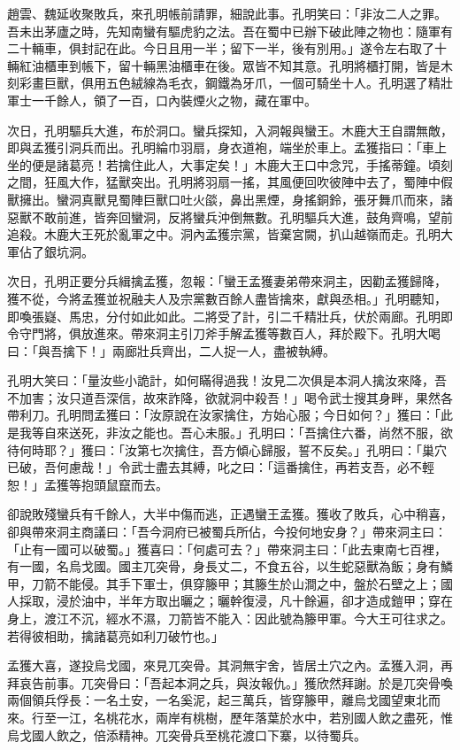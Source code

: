 趙雲、魏延收聚敗兵，來孔明帳前請罪，細說此事。孔明笑曰：「非汝二人之罪。吾未出茅廬之時，先知南蠻有驅虎豹之法。吾在蜀中已辦下破此陣之物也：隨軍有二十輛車，俱封記在此。今日且用一半；留下一半，後有別用。」遂令左右取了十輛紅油櫃車到帳下，留十輛黑油櫃車在後。眾皆不知其意。孔明將櫃打開，皆是木刻彩畫巨獸，俱用五色絨線為毛衣，鋼鐵為牙爪，一個可騎坐十人。孔明選了精壯軍士一千餘人，領了一百，口內裝煙火之物，藏在軍中。

次日，孔明驅兵大進，布於洞口。蠻兵探知，入洞報與蠻王。木鹿大王自謂無敵，即與孟獲引洞兵而出。孔明綸巾羽扇，身衣道袍，端坐於車上。孟獲指曰：「車上坐的便是諸葛亮！若擒住此人，大事定矣！」木鹿大王口中念咒，手搖蒂鐘。頃刻之間，狂風大作，猛獸突出。孔明將羽扇一搖，其風便回吹彼陣中去了，蜀陣中假獸擁出。蠻洞真獸見蜀陣巨獸口吐火燄，鼻出黑煙，身搖銅鈴，張牙舞爪而來，諸惡獸不敢前進，皆奔回蠻洞，反將蠻兵沖倒無數。孔明驅兵大進，鼓角齊鳴，望前追殺。木鹿大王死於亂軍之中。洞內孟獲宗黨，皆棄宮闕，扒山越嶺而走。孔明大軍佔了銀坑洞。

次日，孔明正要分兵緝擒孟獲，忽報：「蠻王孟獲妻弟帶來洞主，因勸孟獲歸降，獲不從，今將孟獲並祝融夫人及宗黨數百餘人盡皆擒來，獻與丞相。」孔明聽知，即喚張嶷、馬忠，分付如此如此。二將受了計，引二千精壯兵，伏於兩廊。孔明即令守門將，俱放進來。帶來洞主引刀斧手解孟獲等數百人，拜於殿下。孔明大喝曰：「與吾擒下！」兩廊壯兵齊出，二人捉一人，盡被執縛。

孔明大笑曰：「量汝些小詭計，如何瞞得過我！汝見二次俱是本洞人擒汝來降，吾不加害；汝只道吾深信，故來詐降，欲就洞中殺吾！」喝令武士搜其身畔，果然各帶利刀。孔明問孟獲曰：「汝原說在汝家擒住，方始心服；今日如何？」獲曰：「此是我等自來送死，非汝之能也。吾心未服。」孔明曰：「吾擒住六番，尚然不服，欲待何時耶？」獲曰：「汝第七次擒住，吾方傾心歸服，誓不反矣。」孔明曰：「巢穴已破，吾何慮哉！」令武士盡去其縛，叱之曰：「這番擒住，再若支吾，必不輕恕！」孟獲等抱頭鼠竄而去。

卻說敗殘蠻兵有千餘人，大半中傷而逃，正遇蠻王孟獲。獲收了敗兵，心中稍喜，卻與帶來洞主商議曰：「吾今洞府已被蜀兵所佔，今投何地安身？」帶來洞主曰：「止有一國可以破蜀。」獲喜曰：「何處可去？」帶來洞主曰：「此去東南七百裡，有一國，名烏戈國。國主兀突骨，身長丈二，不食五谷，以生蛇惡獸為飯；身有鱗甲，刀箭不能侵。其手下軍士，俱穿籐甲；其籐生於山澗之中，盤於石壁之上；國人採取，浸於油中，半年方取出曬之；曬幹復浸，凡十餘遍，卻才造成鎧甲；穿在身上，渡江不沉，經水不濕，刀箭皆不能入：因此號為籐甲軍。今大王可往求之。若得彼相助，擒諸葛亮如利刀破竹也。」

孟獲大喜，遂投烏戈國，來見兀突骨。其洞無宇舍，皆居土穴之內。孟獲入洞，再拜哀告前事。兀突骨曰：「吾起本洞之兵，與汝報仇。」獲欣然拜謝。於是兀突骨喚兩個領兵俘長：一名土安，一名奚泥，起三萬兵，皆穿籐甲，離烏戈國望東北而來。行至一江，名桃花水，兩岸有桃樹，歷年落葉於水中，若別國人飲之盡死，惟烏戈國人飲之，倍添精神。兀突骨兵至桃花渡口下寨，以待蜀兵。

